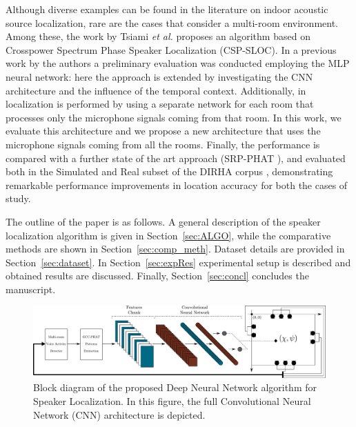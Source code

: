 \documentclass[review]{elsarticle}
\newcommand{\secref}[1]{Section~\ref{#1}}
\begin{document}
Although diverse examples can be found in the literature on indoor acoustic source localization, rare are the cases that consider a multi-room environment. Among these, the work by Tsiami \textit{et al.} \cite{tsiami2014experiments} proposes an algorithm based on Crosspower Spectrum Phase Speaker Localization (CSP-SLOC). 
In a previous work by the authors \cite{vesperini2016sloc} a preliminary evaluation was conducted employing the MLP neural network: here the approach is extended by investigating the CNN architecture and the influence of the temporal context. Additionally, in \cite{vesperini2016sloc} localization is performed by using a separate network for each room that processes only the microphone signals coming from that room. In this work, we evaluate this architecture and we propose a new architecture that uses the microphone signals coming from all the rooms. Finally, the performance is compared with a further state of the art approach (SRP-PHAT \cite{DoSY07}), and evaluated both in the Simulated and Real subset of the DIRHA corpus \cite{cristoforetti2014dirha}, demonstrating remarkable performance improvements in location accuracy for both the cases of study.


The outline of the paper is as follows. A general description of the speaker localization algorithm is given in  \secref{sec:ALGO}, while the comparative methods are shown in \secref{sec:comp_meth}. Dataset details are provided in \secref{sec:dataset}. In \secref{sec:expRes} experimental setup is described and obtained results are discussed.
Finally, \secref{sec:concl} concludes the manuscript.

\begin{figure}[t]
	\centering
	\includegraphics[width=\textwidth]{imgs/alg_2_2}
	\caption{Block diagram of the proposed Deep Neural Network algorithm for Speaker Localization. 	In this figure, the full Convolutional Neural Network (CNN) architecture is depicted.}
	\label{fig:proposed_method}
\end{figure}
\end{document}
